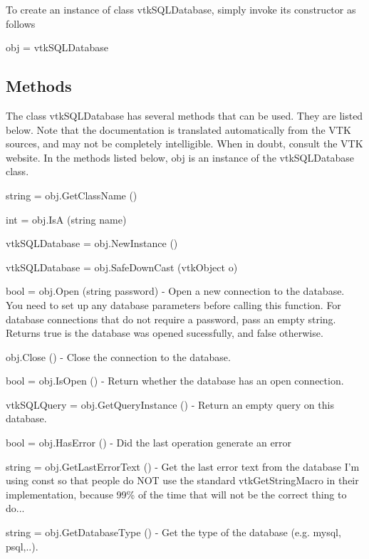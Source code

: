 To create an instance of class vtk\-S\-Q\-L\-Database, simply invoke its constructor as follows \begin{DoxyVerb}  obj = vtkSQLDatabase
\end{DoxyVerb}
 \hypertarget{vtkwidgets_vtkxyplotwidget_Methods}{}\subsection{Methods}\label{vtkwidgets_vtkxyplotwidget_Methods}
The class vtk\-S\-Q\-L\-Database has several methods that can be used. They are listed below. Note that the documentation is translated automatically from the V\-T\-K sources, and may not be completely intelligible. When in doubt, consult the V\-T\-K website. In the methods listed below, {\ttfamily obj} is an instance of the vtk\-S\-Q\-L\-Database class. 
\begin{DoxyItemize}
\item {\ttfamily string = obj.\-Get\-Class\-Name ()}  
\item {\ttfamily int = obj.\-Is\-A (string name)}  
\item {\ttfamily vtk\-S\-Q\-L\-Database = obj.\-New\-Instance ()}  
\item {\ttfamily vtk\-S\-Q\-L\-Database = obj.\-Safe\-Down\-Cast (vtk\-Object o)}  
\item {\ttfamily bool = obj.\-Open (string password)} -\/ Open a new connection to the database. You need to set up any database parameters before calling this function. For database connections that do not require a password, pass an empty string. Returns true is the database was opened sucessfully, and false otherwise.  
\item {\ttfamily obj.\-Close ()} -\/ Close the connection to the database.  
\item {\ttfamily bool = obj.\-Is\-Open ()} -\/ Return whether the database has an open connection.  
\item {\ttfamily vtk\-S\-Q\-L\-Query = obj.\-Get\-Query\-Instance ()} -\/ Return an empty query on this database.  
\item {\ttfamily bool = obj.\-Has\-Error ()} -\/ Did the last operation generate an error  
\item {\ttfamily string = obj.\-Get\-Last\-Error\-Text ()} -\/ Get the last error text from the database I'm using const so that people do N\-O\-T use the standard vtk\-Get\-String\-Macro in their implementation, because 99\% of the time that will not be the correct thing to do...  
\item {\ttfamily string = obj.\-Get\-Database\-Type ()} -\/ Get the type of the database (e.\-g. mysql, psql,..).  

\end{DoxyItemize}
